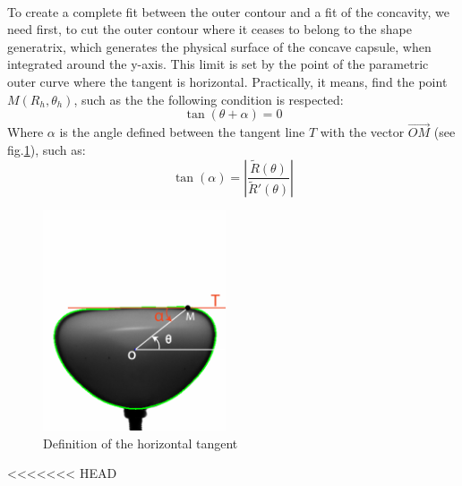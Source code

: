 \paragraph{}
To create a complete fit between the outer contour and a fit of the concavity, we need first, to cut the outer contour where it ceases to belong to the shape generatrix, which generates the physical surface of the concave capsule, when integrated around the y-axis. This limit is set by the point of the parametric outer curve where the tangent is horizontal.
Practically, it means, find the point $M(R_{h},\theta_h)$, such as the the following condition is respected:
\begin{equation}
	\tan(\theta+\alpha) =0
	\label{eq:tangent_horizontal}
\end{equation}
Where $\alpha$ is the angle defined between the tangent line $T$ with the vector $\vec{OM}$ (see fig.\ref{fig:Illustration_tangent}), such as:
\begin{equation}
	\tan(\alpha) =|{\frac {\tilde{R}(\theta )}{\tilde{R}'(\theta )}}|
	\label{eq:tangent}
\end{equation}
\begin{figure}[H] %
	\centering%
  \includegraphics[width=0.48\textwidth]{figures/Chapter_1/tan_alpha.png}
	\caption{Definition of the horizontal tangent}
	\label{fig:Illustration_tangent}
\end{figure}
<<<<<<< HEAD
